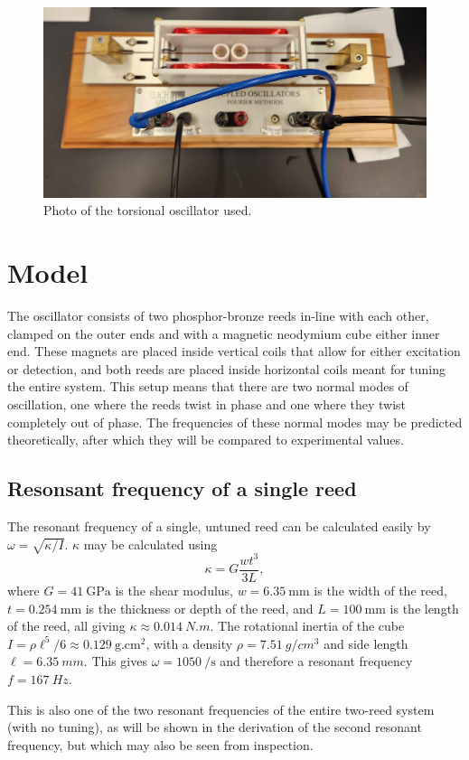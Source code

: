 \documentclass{article}
\begin{document}
\begin{figure}
    \centering
    \includegraphics[width=0.5\linewidth]{20250910_113924.jpg}
    \caption{Photo of the torsional oscillator used.}
\end{figure}

\section{Model}
The oscillator consists of two phosphor-bronze reeds in-line with each other, clamped on the outer ends and with a magnetic neodymium cube either inner end. These magnets are placed inside vertical coils that allow for either excitation or detection, and both reeds are placed inside horizontal coils meant for tuning the entire system.
This setup means that there are two normal modes of oscillation, one where the reeds twist in phase and one where they twist completely out of phase. The frequencies of these normal modes may be predicted theoretically, after which they will be compared to experimental values.


\subsection{Resonsant frequency of a single reed}
The resonant frequency of a single, untuned reed can be calculated easily by $\omega = \sqrt{\kappa/I}$. $\kappa$ may be calculated using \[ \kappa = G\frac{wt^3}{3L}, \] where $G = \qty{41}{\giga\pascal}$ is the shear modulus, $w = \qty{6.35}{\mm}$ is the width of the reed, $t = \qty{0.254}{\mm}$ is the thickness or depth of the reed, and $L = \qty{100}{\mm}$ is the length of the reed, all giving $\kappa \approx \qty{0.014}{N.m}$. The rotational inertia of the cube $I = \rho\ell^5/6 \approx \qty{0.129}{\gram.\cm^2}$, with a density $\rho = \qty{7.51}{g/cm^3}$ and side length $\ell = \qty{6.35}{mm}$. This gives $\omega = \qty{1050}{\per\s}$ and therefore a resonant frequency $f = \qty{167}{Hz}$.

This is also one of the two resonant frequencies of the entire two-reed system (with no tuning), as will be shown in the derivation of the second resonant frequency, but which may also be seen from inspection.
\end{document}
